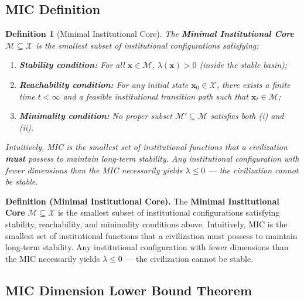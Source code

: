 \documentclass[12pt,a4paper]{article}
\newtheorem{definition}[theorem]{Definition}
\theoremstyle{definition}
\newcommand{\calM}{\mathcal{M}}
\newcommand{\calX}{\mathcal{X}}
\newcommand{\lb}{\lambda}
\begin{document}
\subsection{MIC Definition}
\label{sec:mic_def}

\begin{definition}[Minimal Institutional Core]
\label{def:mic}
The \textbf{Minimal Institutional Core} $\calM \subseteq \calX$ is the smallest subset of institutional configurations satisfying:
\begin{enumerate}[label=(\roman*), leftmargin=*]
    \item \textbf{Stability condition:} For all $\mathbf{x} \in \calM$, $\lb(\mathbf{x}) > 0$ (inside the stable basin);
    \item \textbf{Reachability condition:} For any initial state $\mathbf{x}_0 \in \calX$, there exists a finite time $t < \infty$ and a feasible institutional transition path such that $\mathbf{x}_t \in \calM$;
    \item \textbf{Minimality condition:} No proper subset $\calM' \subsetneq \calM$ satisfies both (i) and (ii).
\end{enumerate}
Intuitively, MIC is the smallest set of institutional functions that a civilization \textbf{must} possess to maintain long-term stability. Any institutional configuration with fewer dimensions than the MIC necessarily yields $\lb \leq 0$ --- the civilization cannot be stable.
\end{definition}

\noindent
\textbf{Definition (Minimal Institutional Core).}
The \textbf{Minimal Institutional Core} $\calM \subseteq \calX$ is the smallest subset of institutional configurations satisfying stability, reachability, and minimality conditions above. Intuitively, MIC is the smallest set of institutional functions that a civilization must possess to maintain long-term stability. Any institutional configuration with fewer dimensions than the MIC necessarily yields $\lb \leq 0$ --- the civilization cannot be stable.

\subsection{MIC Dimension Lower Bound Theorem}
\label{sec:mic_dim}
\end{document}
